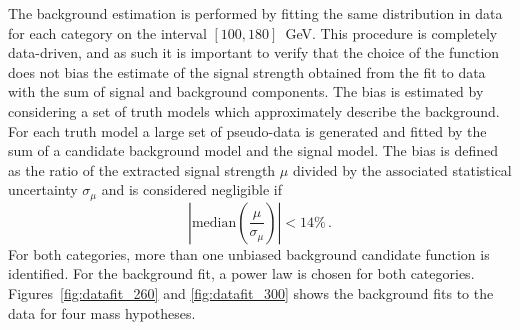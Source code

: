 The background estimation is performed by fitting the same distribution in data
for each category on the interval
$[100, 180]$~GeV. This procedure is completely data-driven, and as such it is important
to verify that the choice of the function does not bias the estimate of the signal
strength obtained from the fit to data with the sum of signal and background components.
The bias is estimated by considering a set of truth models which approximately describe the background.
For each truth model a large set of pseudo-data is generated and fitted by the sum of a candidate
background model and the signal model. The bias is defined as the ratio of the extracted signal strength
$\mu$ divided by the associated statistical uncertainty $\sigma_\mu$ and
is considered negligible if
\begin{equation}
\left|\text{median}\left(\frac{\mu}{\sigma_\mu}\right)\right| < 14\% \,.
\end{equation}
For both categories, more than one unbiased background candidate function is identified.
For the background fit,
a power law is chosen for both categories. Figures~\ref{fig:datafit_260} and \ref{fig:datafit_300}
shows the background fits to the data for four mass hypotheses.

